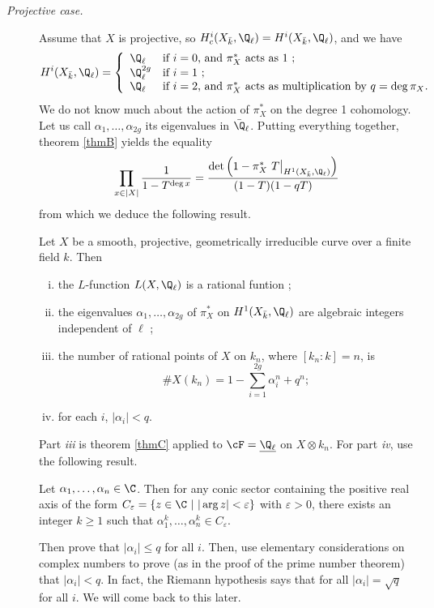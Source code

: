 \begin{description} 
\item[\it Projective case.]
Assume that $X$ is projective, so $H_c^i(X_{\bar k}, \Q_\ell) = H^i(X_{\bar k}, \Q_\ell)$, and we have
$$ 
H^i(X_{\bar k}, \Q_\ell) =
\left\{\begin{array}{ll}
\Q_\ell & \text{if $i = 0$, and $\pi_X^*$ acts as 1 ;} \\
\Q_\ell^{2g} & \text{if $i = 1$ ;} \\
\Q_\ell & \text{if $i = 2$, and $\pi_X^*$ acts as multiplication by $q=\deg \pi_X$.} 
\end{array}\right.
$$
We do not know much about the action of $\pi_X^*$ on the degree 1 cohomology. Let us call $\alpha_1, \ldots, \alpha_{2g}$ its eigenvalues in $\bar\Q_\ell$. Putting everything together, theorem \ref{thmB} yields the equality
$$
\prod_{x\in |X|} \frac{1}{1-T^{\deg x}} = \frac{\det\left(1- \pi_X^*\ T\big|_{H^1(X_{\bar k}, \Q_\ell)}\right)}{(1-T)(1-qT)}
$$
from which we deduce the following result.

\begin{cor}
Let $X$ be a smooth, projective, geometrically irreducible curve over a finite field $k$. Then
\begin{enumerate}[i.]
\item the $L$-function $L(X, \Q_\ell)$ is a rational funtion ;
\item the eigenvalues $\alpha_1, \ldots, \alpha_{2g}$ of $\pi_X^*$ on $H^1(X_{\bar k}, \Q_\ell)$ are algebraic integers independent of $\ell$ ;
\item the number of rational points of $X$ on $k_n$, where $[k_n: k] = n$, is  
$$
\# X(k_n) = 1-\sum_{i=1}^{2g}\alpha_i^n +q^n ; 
$$ 
\item 
for each $i$, $|\alpha_i| < q$. 
\end{enumerate}
\end{cor}	

Part {\it iii} is theorem \ref{thmC} applied to $\cF = \underline{\Q_\ell}$ on $X\otimes k_n$. For part {\it iv}, use the following result.
\begin{exo}
Let $\alpha_1, \dots, \alpha_n \in \C$. Then for any conic sector containing the positive real axis of the form $C_\varepsilon = \{ z \in \C \ | \ |\arg z| < \varepsilon \}$ with $\varepsilon >0$, there exists an integer $k \geqslant 1$ such that $\alpha_1^k, \dots, \alpha_n^k \in C_\varepsilon$.
\end{exo}

Then prove that $|\alpha_i| \leqslant q$ for all $i$. Then, use elementary considerations on complex numbers to prove (as in the proof of the prime number theorem) that $|\alpha_i| < q$. In fact, the Riemann hypothesis says that for all $|\alpha_i| = \sqrt q$ for all $i$. We will come back to this later.


\end{description}
